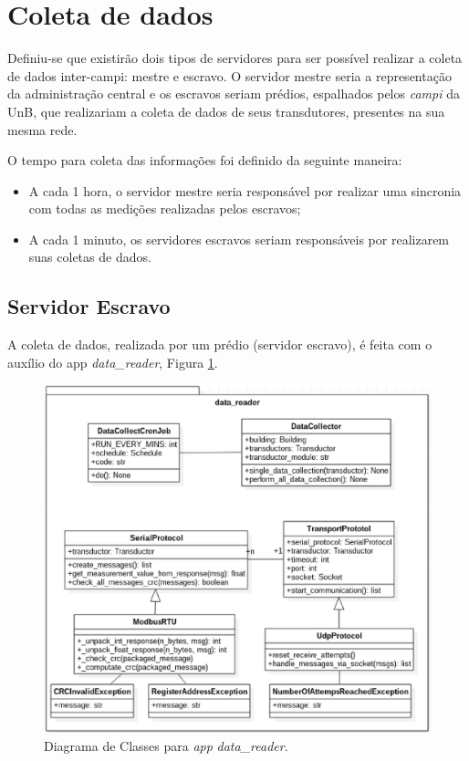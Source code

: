\section{Coleta de dados}
Definiu-se que existirão dois tipos de servidores para ser possível realizar a coleta de dados inter-campi: mestre e escravo. O servidor mestre seria a representação da administração central e os escravos seriam prédios, espalhados pelos \textit{campi} da UnB, que realizariam a coleta de dados de seus transdutores, presentes na sua mesma rede.

O tempo para coleta das informações foi definido da seguinte maneira:

\begin{itemize}
    \item A cada 1 hora, o servidor mestre seria responsável por realizar uma sincronia com todas as medições realizadas pelos escravos;
    \item A cada 1 minuto, os servidores escravos seriam responsáveis por realizarem suas coletas de dados.
\end{itemize}

\subsection{Servidor Escravo}
A coleta de dados, realizada por um prédio (servidor escravo), é feita com o auxílio do app \textit{data\_reader}, Figura \ref{data_reader}.

\begin{figure}[!h]
    \centering
    \includegraphics[keepaspectratio=true,scale=0.7]{figuras/data_reader.eps}
    \caption{Diagrama de Classes para \textit{app} \textit{data\_reader}.}
    \label{data_reader}
\end{figure}


